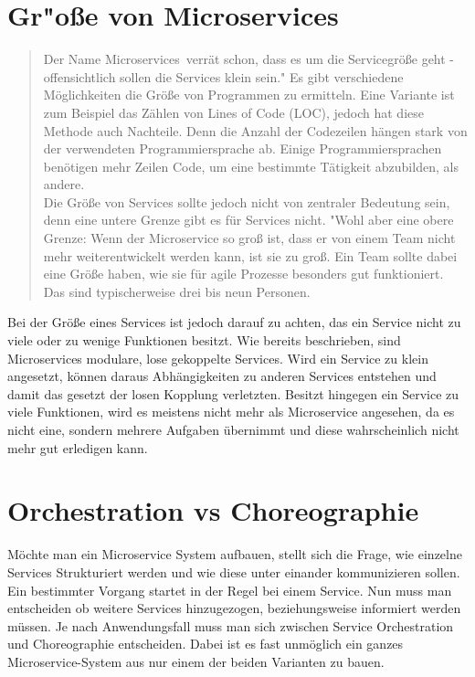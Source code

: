 
\section{Gr"o\ss e von Microservices}
\label{sec:groesseMicroservice}
\begin{quotation}
    \frqq Der Name \frqq Microservices\flqq\ verrät schon, dass es um die Servicegröße geht - offensichtlich sollen die Services klein sein."\cite[S. 31]{EWolff2016:Microservices} Es gibt verschiedene Möglichkeiten die Größe von Programmen zu ermitteln. Eine Variante ist zum Beispiel das Zählen von  Lines of Code (LOC), jedoch hat diese Methode auch Nachteile. Denn die Anzahl der Codezeilen hängen stark von der verwendeten Programmiersprache ab. Einige Programmiersprachen benötigen mehr Zeilen Code, um eine bestimmte Tätigkeit abzubilden, als andere.
    \\
    Die Größe von Services sollte jedoch nicht von zentraler Bedeutung sein, denn eine untere Grenze gibt es für Services nicht. "Wohl aber eine obere Grenze: Wenn der Microservice so groß ist, dass er von einem Team nicht mehr weiterentwickelt werden kann, ist sie zu groß. Ein Team sollte dabei eine Größe haben, wie sie für agile Prozesse besonders gut funktioniert. Das sind typischerweise drei bis neun Personen.\flqq\cite[S. 34]{EWolff2016:Microservices}
\end{quotation}

Bei der Größe eines Services ist jedoch darauf zu achten, das ein Service nicht zu viele oder zu wenige Funktionen besitzt. Wie bereits beschrieben, sind Microservices modulare, lose gekoppelte Services. Wird ein Service zu klein angesetzt, können daraus Abhängigkeiten zu anderen Services entstehen und damit das gesetzt der losen Kopplung verletzten. Besitzt hingegen ein Service zu viele Funktionen, wird es meistens nicht mehr als Microservice angesehen, da es nicht eine, sondern mehrere Aufgaben übernimmt und diese wahrscheinlich nicht mehr gut erledigen kann.

\section{Orchestration vs Choreographie}
\label{sec:orchestrationvschoreographie}
Möchte man ein Microservice System aufbauen, stellt sich die Frage, wie einzelne Services Strukturiert werden und wie diese unter einander kommunizieren sollen. Ein bestimmter Vorgang startet in der Regel bei einem Service. Nun muss man entscheiden ob weitere Services hinzugezogen, beziehungsweise informiert werden müssen.
Je nach Anwendungsfall muss man sich zwischen Service Orchestration und Choreographie entscheiden. Dabei ist es fast unmöglich ein ganzes Microservice-System aus nur einem der beiden Varianten zu bauen.

